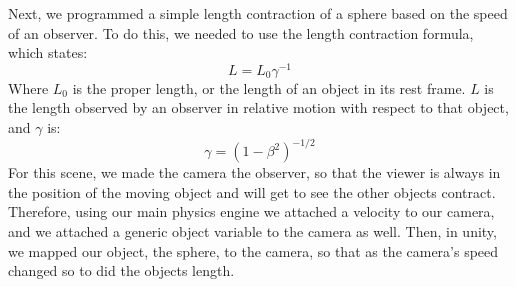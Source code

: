 \documentclass[12pt]{article}
\begin{document}
Next, we programmed a simple length contraction of a sphere based on the speed of an observer. To do this, we needed to use the length contraction formula, which states:
\begin{equation}
L = L_0\gamma^{-1}
\end{equation}
Where $L_0$ is the proper length, or the length of an object in its rest frame. $L$ is the length observed by an observer in relative motion with respect to that object, and $\gamma$ is:
\begin{equation}
\gamma = (1-\beta^2)^{-1/2}
\end{equation}
For this scene, we made the camera the observer, so that the viewer is always in the position of the moving object and will get to see the other objects contract. Therefore, using our main physics engine we attached a velocity to our camera, and we attached a generic object variable to the camera as well. Then, in unity, we mapped our object, the sphere, to the camera, so that as the camera's speed changed so to did the objects length.

\inputminted[firstline=2,lastline=10,linenos,fontsize=\footnotesize,bgcolor=codebg]{csharp}{../unity/Assets/Scripts/CameraFollow.cs}



 
\end{document}
